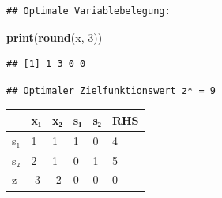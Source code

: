 \documentclass[
]{article}
\newenvironment{Shaded}{\begin{snugshade}}{\end{snugshade}}
\newcommand{\DecValTok}[1]{\textcolor[rgb]{0.00,0.00,0.81}{#1}}
\newcommand{\FunctionTok}[1]{\textcolor[rgb]{0.13,0.29,0.53}{\textbf{#1}}}
\newcommand{\NormalTok}[1]{#1}
\newcommand{\SpecialCharTok}[1]{\textcolor[rgb]{0.81,0.36,0.00}{\textbf{#1}}}
\newcommand{\StringTok}[1]{\textcolor[rgb]{0.31,0.60,0.02}{#1}}
\newcounter{none} %
\begin{document}
\begin{verbatim}
## Optimale Variablebelegung:
\end{verbatim}

\begin{Shaded}
\begin{Highlighting}[]
\FunctionTok{print}\NormalTok{(}\FunctionTok{round}\NormalTok{(x, }\DecValTok{3}\NormalTok{))}
\end{Highlighting}
\end{Shaded}

\begin{verbatim}
## [1] 1 3 0 0
\end{verbatim}

\begin{Shaded}
\end{Shaded}

\begin{verbatim}
## Optimaler Zielfunktionswert z* = 9
\end{verbatim}

{\def\LTcaptype{none} %
\begin{longtable}[]{@{}llllll@{}}
\toprule\noalign{}
& x₁ & x₂ & s₁ & s₂ & RHS \\
\midrule\noalign{}
\endhead
\bottomrule\noalign{}
\endlastfoot
s₁ & 1 & 1 & 1 & 0 & 4 \\
s₂ & 2 & 1 & 0 & 1 & 5 \\
z & -3 & -2 & 0 & 0 & 0 \\
\end{longtable}
}
\end{document}
